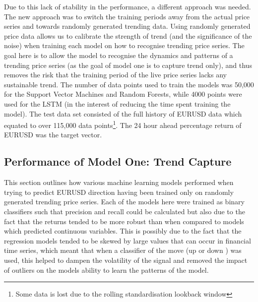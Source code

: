 \documentclass[11pt]{article}
\begin{document}
Due to this lack of stability in the performance, a different approach was needed. The new approach was to switch the training periods away from the actual price series and towards randomly generated trending data. Using randomly generated price data allows us to calibrate the strength of trend (and the significance of the noise) when training each model on how to recognise trending price series. The goal here is to allow the model to recognise the dynamics and patterns of a trending price series (as the goal of model one is to capture trend only), and thus removes the risk that the training period of the live price series lacks any sustainable trend. The number of data points used to train the models was 50,000 for the Support Vector Machines and Random Forests, while 4000 points were used for the LSTM (in the interest of reducing the time spent training the model). The test data set consisted of the full history of EURUSD data which equated to over 115,000 data points\footnote{Some data is lost due to the rolling standardisation lookback window}. The 24 hour ahead percentage return of EURUSD was the target vector.

\subsection{Performance of Model One: Trend Capture} \label{model1}

This section outlines how various machine learning models performed when trying to predict EURUSD direction having been trained only on randomly generated trending price series. Each of the models here were trained as binary classifiers such that precision and recall could be calculated but also due to the fact that the returns tended to be more robust than when compared to models which predicted continuous variables. This is possibly due to the fact that the regression models tended to be skewed by large values that can occur in financial time series, which meant that when a classifier of the move (up or down ) was used, this helped to dampen the volatility of the signal and removed the impact of outliers on the models ability to learn the patterns of the model.
\end{document}
